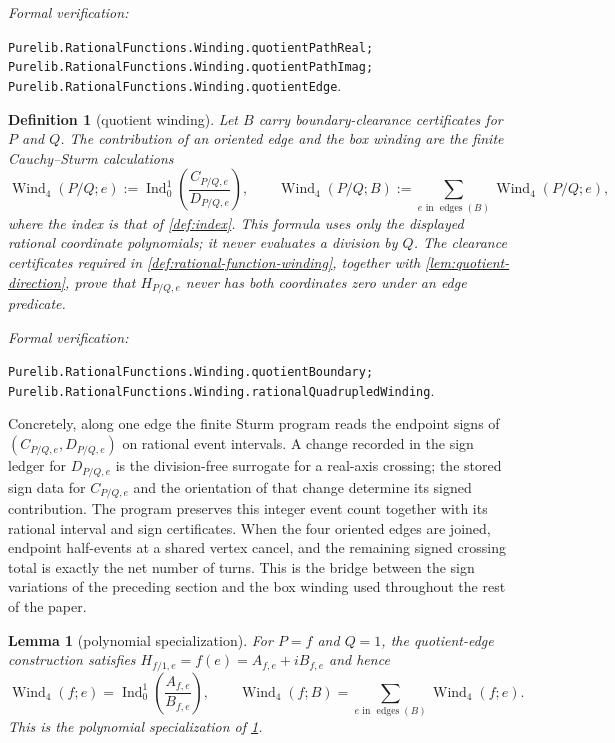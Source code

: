 \documentclass[11pt]{article}
\newtheorem{lemma}[theorem]{Lemma}
\newtheorem{definition}[theorem]{Definition}
\newcommand{\Wind}{\operatorname{Wind}}
\newcommand{\Ind}{\operatorname{Ind}}
\newcommand{\leanref}[1]{\par\smallskip\noindent
  \emph{Formal verification:}\par\nobreak
  {\raggedright\nolinkurl{#1}.\par}}
\begin{document}
\leanref{Purelib.RationalFunctions.Winding.quotientPathReal;
Purelib.RationalFunctions.Winding.quotientPathImag;
Purelib.RationalFunctions.Winding.quotientEdge}

\begin{definition}[quotient winding]
\label{def:quotient-winding}
Let $B$ carry boundary-clearance certificates for $P$ and $Q$.  The
contribution of an oriented edge and the box winding are the finite
Cauchy--Sturm calculations
\[
 \Wind_4(P/Q;e)
   :=\Ind_0^1\!\left(\frac{C_{P/Q,e}}{D_{P/Q,e}}\right),
 \qquad
 \Wind_4(P/Q;B)
   :=\sum_{e\text{ in }\operatorname{edges}(B)}\Wind_4(P/Q;e),
\]
where the index is that of \cref{def:index}.  This formula uses only the
displayed rational coordinate polynomials; it never evaluates a division
by $Q$.  The clearance certificates required in
\cref{def:rational-function-winding}, together with
\cref{lem:quotient-direction}, prove that $H_{P/Q,e}$ never has both
coordinates zero under an edge predicate.
\end{definition}

\leanref{Purelib.RationalFunctions.Winding.quotientBoundary;
Purelib.RationalFunctions.Winding.rationalQuadrupledWinding}

Concretely, along one edge the finite Sturm program reads the endpoint signs
of $(C_{P/Q,e},D_{P/Q,e})$ on rational event intervals.  A change recorded
in the sign ledger for $D_{P/Q,e}$ is the division-free surrogate for a
real-axis crossing; the stored sign data for $C_{P/Q,e}$ and the orientation
of that change determine its signed contribution.  The program preserves
this integer event count together with its rational interval and sign
certificates.  When the four oriented edges are joined, endpoint half-events at
a shared vertex cancel, and the remaining signed crossing total is exactly
the net number of turns.  This is the bridge between the sign variations of
the preceding section and the box winding used throughout the rest of the
paper.

\begin{lemma}[polynomial specialization]
\label{lem:polynomial-winding-specialization}
For $P=f$ and $Q=1$, the quotient-edge construction satisfies
$H_{f/1,e}=f(e)=A_{f,e}+iB_{f,e}$ and hence
\[
 \Wind_4(f;e)=\Ind_0^1\!\left(\frac{A_{f,e}}{B_{f,e}}\right),
 \qquad
 \Wind_4(f;B)=\sum_{e\text{ in }\operatorname{edges}(B)}\Wind_4(f;e).
\]
This is the polynomial specialization of \cref{def:quotient-winding}.
\end{lemma}
\end{document}
